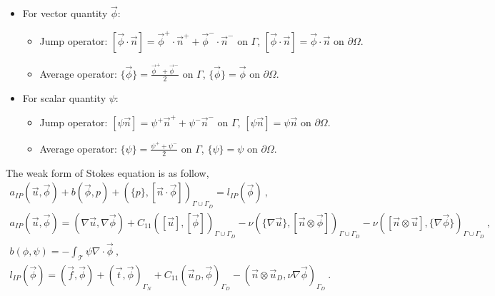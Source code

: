 \documentclass[graybox]{svmult}
\begin{document}
\begin{itemize}
\item For vector quantity $\overrightarrow{\phi}$:
\begin{itemize}
\item Jump operator: 
$\left[\overrightarrow{\phi} \cdot \overrightarrow{n}\right] = \overrightarrow{\phi}^+ \cdot \overrightarrow{n}^+ + \overrightarrow{\phi}^- \cdot \overrightarrow{n}^-$ on $\Gamma$, $\left[\overrightarrow{\phi} \cdot \overrightarrow{n}\right] = \overrightarrow{\phi} \cdot \overrightarrow{n}$ on $\partial \Omega$.
\item Average operator:
$\lbrace \overrightarrow{\phi} \rbrace = \frac{\overrightarrow{\phi}^+ + \overrightarrow{\phi}^-}{2}$ on $\Gamma$, $\lbrace \overrightarrow{\phi} \rbrace = \overrightarrow{\phi}$ on $\partial \Omega$.
\end{itemize}
\item For scalar quantity $\psi$:
\begin{itemize}
\item Jump operator:
$\left[\psi \overrightarrow{n} \right] = \psi^+ \overrightarrow{n}^+ + \psi^- \overrightarrow{n}^-$ on $\Gamma$, $\left[\psi \overrightarrow{n} \right] = \psi \overrightarrow{n}$ on $\partial \Omega$.
\item Average operator:
$\lbrace \psi \rbrace = \frac{\psi^+ + \psi^-}{2}$ on $\Gamma$, $\lbrace \psi \rbrace = \psi$ on $\partial \Omega$. 
\end{itemize}
\end{itemize}

The weak form of Stokes equation is as follow,
\begin{gather}\label{stokes_weak_ch3}
a_{IP}(\overrightarrow{u},\overrightarrow{\phi}) + b(\overrightarrow{\phi},p) + \left( \lbrace p \rbrace,[\overrightarrow{n} \cdot \overrightarrow{\phi}] \right)_{\Gamma \cup \Gamma_D} = l_{IP}(\overrightarrow{\phi}) \ , \\
a_{IP}(\overrightarrow{u},\overrightarrow{\phi}) = \left( \nabla \overrightarrow{u}, \nabla \overrightarrow{\phi} \right) + C_{11} \left( [\overrightarrow{u}],[\overrightarrow{\phi}] \right)_{\Gamma \cup \Gamma_D} - \nu \left( \lbrace \nabla \overrightarrow{u}\rbrace ,[\overrightarrow{n} \otimes \overrightarrow{\phi}] \right)_{\Gamma \cup \Gamma_D} - \nu \left( [\overrightarrow{n} \otimes \overrightarrow{u}], \lbrace \nabla \overrightarrow{\phi} \rbrace \right)_{\Gamma \cup \Gamma_D} \ , \\
b(\phi,\psi) = -\int_{\mathcal{T}} \psi \nabla \cdot \overrightarrow{\phi} \ , \\
l_{IP}(\overrightarrow{\phi}) = \left( \overrightarrow{f},\overrightarrow{\phi} \right) + \left( \overrightarrow{t},\overrightarrow{\phi} \right)_{\Gamma_N} + C_{11} \left(\overrightarrow{u}_D,\overrightarrow{\phi}\right)_{\Gamma_D} - \left( \overrightarrow{n} \otimes \overrightarrow{u}_D, \nu \nabla \overrightarrow{\phi} \right)_{\Gamma_D} \ .
\end{gather}
\end{document}
